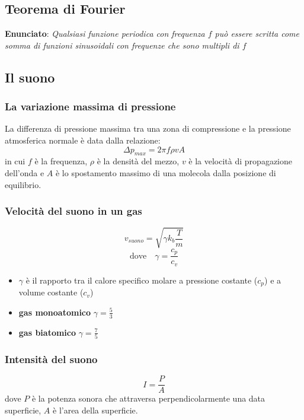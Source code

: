 \documentclass[12pt]{article}
\begin{document}
\subsection{Teorema di Fourier}
\textbf{Enunciato}: \textit{Qualsiasi funzione periodica con frequenza $f$ può essere scritta come somma di funzioni sinusoidali con frequenze che sono multipli di $f$}

\subsection{Il suono}
\subsubsection{La variazione massima di pressione}
La differenza di pressione massima tra una zona di compressione e la pressione atmosferica normale è data dalla relazione:
$$ \Delta p_{max} = 2\pi f\rho vA $$
in cui $f$ è la frequenza, $\rho$ è la densità del mezzo, $v$ è la velocità di propagazione dell'onda e $A$ è lo spostamento massimo di una molecola dalla posizione di equilibrio.

\subsubsection{Velocità del suono in un gas}
$$ v_{suono} = \sqrt{\gamma k_b \frac{T}{m}} $$
$$ \text{dove} \hspace{1em} \gamma = \frac{c_p}{c_v} $$
\begin{itemize}
    \item $\gamma$ è il rapporto tra il calore specifico molare a pressione costante ($c_p$) e a volume costante ($c_v$)
    \item \textbf{gas monoatomico} \textrightarrow \hspace{1em} $\gamma = \frac{5}{3}$
    \item \textbf{gas biatomico} \textrightarrow \hspace{1em} $\gamma = \frac{7}{5}$
\end{itemize}

\subsubsection{Intensità del suono}
$$ I = \frac{P}{A} $$
dove $P$ è la potenza sonora che attraversa perpendicolarmente una data superficie, $A$ è l'area della superficie.

\vspace{1em}
\end{document}
